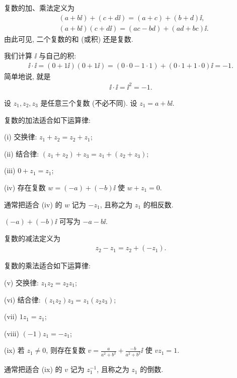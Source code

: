 \begin{definition}
    复数的加、乘法定义为
    \begin{align*}
         & (a + b \ii) + (c + d \ii) = (a + c) + (b + d) \ii,   \\
         & (a + b \ii) (c + d \ii) = (ac - bd) + (ad + bc) \ii.
    \end{align*}
    由此可见, 二个复数的和 (或积) 还是复数.
\end{definition}

\begin{example}
    我们计算 $\ii$ 与自己的积:
    \begin{align*}
        \ii \cdot \ii = (0 + 1\ii) (0 + 1\ii) = (0 \cdot 0 - 1 \cdot 1) + (0 \cdot 1 + 1 \cdot 0) \ii = -1.
    \end{align*}
    简单地说, 就是
    \begin{align*}
        \ii \cdot \ii = \ii^2 = -1.
    \end{align*}
\end{example}

设 $z_1, z_2, z_3$ 是任意三个复数 (不必不同). 设 $z_1 = a + b \ii$.

\begin{proposition}
    复数的加法适合如下运算律:

    (i) 交换律: $z_1 + z_2 = z_2 + z_1$;

    (ii) 结合律: $(z_1 + z_2) + z_3 = z_1 + (z_2 + z_3)$;

    (iii) $0 + z_1 = z_1$;

    (iv) 存在复数 $w = (-a) + (-b) \ii$ 使 $w + z_1 = 0$.

    通常把适合 (iv) 的 $w$ 记为 $-z_1$, 且称之为 $z_1$ 的相反数.
\end{proposition}

\begin{remark}
    $(-a) + (-b) \ii$ 可写为 $-a-b \ii$.
\end{remark}

\begin{definition}
    复数的减法定义为
    \begin{align*}
        z_2 - z_1 = z_2 + (-z_1).
    \end{align*}
\end{definition}

\begin{proposition}
    复数的乘法适合如下运算律:

    (v) 交换律: $z_1 z_2 = z_2 z_1$;

    (vi) 结合律: $(z_1 z_2) z_3 = z_1 (z_2 z_3)$;

    (vii) $1 z_1 = z_1$;

    (viii) $(-1) z_1 = -z_1$;

    (ix) 若 $z_1 \neq 0$, 则存在复数 $v = \frac{a}{a^2 + b^2} + \frac{-b}{a^2 + b^2} \ii$ 使 $v z_1 = 1$.

    通常把适合 (ix) 的 $v$ 记为 $z_1^{-1}$, 且称之为 $z_1$ 的倒数.
\end{proposition}

